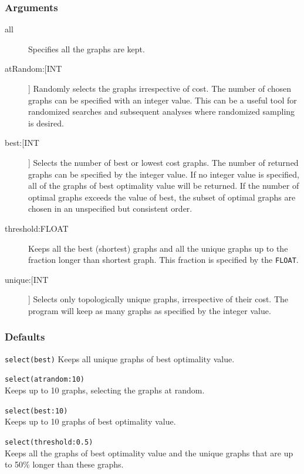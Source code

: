 	\subsubsection{Arguments}
	\begin{description}
		
		\item[all] Specifies all the graphs are kept.
		
		\item[atRandom:[INT]] Randomly selects the graphs irrespective of cost. The 
		number of chosen graphs can be specified with an integer value. This can 
		be a useful tool for randomized searches and subsequent analyses where 
		randomized sampling is desired.
			
		\item[best:[INT]] Selects the number of best or lowest cost graphs. The number 
		of returned graphs can be specified by the integer value. If no integer value is 
		specified, all of the graphs of best optimality value will be returned. If the number 
		of optimal graphs exceeds the value of best, the subset of optimal graphs are 
		chosen in an unspecified but consistent order.
							
		\item[threshold:FLOAT] Keeps all the best (shortest) graphs and all the unique 
		graphs up to the fraction longer than shortest graph. This fraction is specified by 
		the \texttt{FLOAT}.
			
		\item[unique:[INT]] Selects only topologically unique graphs, irrespective of their
		cost. The program will keep as many graphs as specified by the integer value.
			
	\end{description}

	\subsubsection{Defaults}
		\texttt{select(best)} Keeps all unique graphs of best optimality value.
		
	\begin{example}
	
		\item{\texttt{select(atrandom:10)}\\ Keeps up to 10 graphs, selecting the graphs
		 at random.}
						
		\item{\texttt{select(best:10)}\\ Keeps up to 10 graphs of best optimality value.}
		
		\item{\texttt{select(threshold:0.5)}\\ Keeps all the graphs of best optimality value
		and the unique graphs that are up to 50\% longer than these graphs.}
		
	\end{example}

